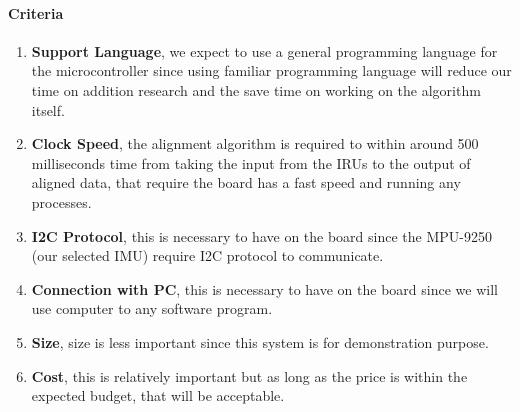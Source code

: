 \paragraph{Criteria}
\begin{enumerate}
	\item \textbf{Support Language}, we expect to use a general programming language for the microcontroller since using familiar programming language will reduce our time on addition research and the save time on working on the algorithm itself.
	\item \textbf{Clock Speed}, the alignment algorithm is required to within around 500 milliseconds time from taking the input from the IRUs to the output of aligned data, that require the board has a fast speed and running any processes.
	\item \textbf{I2C Protocol}, this is necessary to have on the board since the MPU-9250 (our selected IMU) require I2C protocol to communicate.
	\item \textbf{Connection with PC}, this is necessary to have on the board since we will use computer to any software program.
	\item \textbf{Size}, size is less important since this system is for demonstration purpose.
	\item \textbf{Cost}, this is relatively important but as long as the price is within the expected budget, that will be acceptable.\\
\end{enumerate}

\newpage
